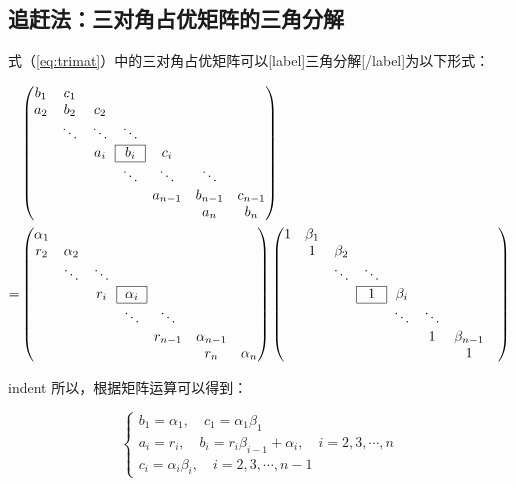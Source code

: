\documentclass[UTF8,nofonts]{ctexart}
\begin{document}
\subsection*{追赶法：三对角占优矩阵的三角分解}

式（\ref{eq:trimat}）中的三对角占优矩阵可以[label]三角分解[/label]为以下形式：

\begin{align*}
&
\begin{pmatrix}
b_1 & c_1 & & & & & \\
a_2 & b_2 & c_2 & & & & \\
& \ddots & \ddots & \ddots & & & \\
\cline{4-4}
& & a_i & \multicolumn{1}{|c|}{\multirow{1}{*}{$b_i$}} & c_i & & \\
\cline{4-4}
& & & \ddots & \ddots & \ddots & \\
& & & & a_{n-1} & b_{n-1} & c_{n-1} \\
& & & & & a_{n} & b_{n}
\end{pmatrix} \\
=&
\begin{pmatrix}
\alpha_1 & & & & & & \\
r_2 & \alpha_2 & & & & & \\
& \ddots & \ddots & & & & \\
\cline{4-4}
& & r_i & \multicolumn{1}{|c|}{\multirow{1}{*}{$\alpha_i$}} & & & \\
\cline{4-4}
& & & \ddots & \ddots & & \\
& & & & r_{n-1} & \alpha_{n-1} & \\
& & & & & r_{n} & \alpha_{n}
\end{pmatrix}
\begin{pmatrix}
1 & \beta_1 & & & & & \\
& 1 & \beta_2 & & & & \\
& & \ddots & \ddots & & & \\
\cline{4-4}
& & & \multicolumn{1}{|c|}{\multirow{1}{*}{$1$}} & \beta_i & & & \\
\cline{4-4}
& & & & \ddots & \ddots & & \\
& & & & & 1 & \beta_{n-1} & \\
& & & & & & 1
\end{pmatrix}
\end{align*}

indent 所以，根据矩阵运算可以得到：

\[
\begin{cases}
b_1=\alpha_1,\quad c_1=\alpha_1\beta_1 \\
a_i=r_i,\quad b_i=r_i\beta_{i-1}+\alpha_i,\quad i=2,3,\cdots,n \\
c_i=\alpha_i\beta_i,\quad i=2,3,\cdots,n-1
\end{cases}
\]
\end{document}
